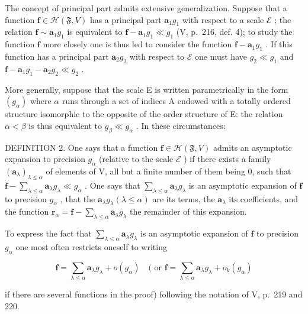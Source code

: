 The concept of principal part admits extensive generalization. Suppose that a function \(\mathbf{f} \in \mathcal{H}(\mathfrak{F}, V)\) has a principal part \(\mathbf{a}_1g_1\) with respect to a scale \(\mathcal{E}\) ; the relation \(\mathbf{f} \sim \mathbf{a}_1g_1\) is equivalent to \(\mathbf{f} - \mathbf{a}_1g_1 \ll g_1\) (V, p.~216, def. 4); to study the function \(\mathbf{f}\) more closely one is thus led to consider the function \(\mathbf{f} - \mathbf{a}_1g_1\) . If this function has a principal part \(\mathbf{a}_2g_2\) with respect to \(\mathcal{E}\) one must have \(g_2 \ll g_1\) and \(\mathbf{f} - \mathbf{a}_1g_1 - \mathbf{a}_2g_2 \ll g_2\) .

More generally, suppose that the scale E is written parametrically in the form \((g_{\alpha})\) where \(\alpha\) runs through a set of indices A endowed with a totally ordered structure isomorphic to the opposite of the order structure of E: the relation \(\alpha < \beta\) is thus equivalent to \(g_{\beta} \ll g_{\alpha}\) . In these circumstances:

DEFINITION 2. One says that a function \(\mathbf{f} \in \mathcal{H}(\mathfrak{F}, V)\) admits an asymptotic expansion to precision \(g_{\alpha}\) (relative to the scale \(\mathcal{E}\) ) if there exists a family \((\mathbf{a}_{\lambda})_{\lambda \leqslant \alpha}\) of elements of V, all but a finite number of them being 0, such that \(\mathbf{f} - \sum_{\lambda \leqslant \alpha} \mathbf{a}_{\lambda} g_{\lambda} \ll g_{\alpha}\) . One says that \(\sum_{\lambda \leqslant \alpha} \mathbf{a}_{\lambda} g_{\lambda}\) is an asymptotic expansion of \(\mathbf{f}\) to precision \(g_{\alpha}\) , that the \(\mathbf{a}_{\lambda} g_{\lambda} (\lambda \leqslant \alpha)\) are its terms, the \(\mathbf{a}_{\lambda}\) its coefficients, and the function \(\mathbf{r}_{\alpha} = \mathbf{f} - \sum_{\lambda \leqslant \alpha} \mathbf{a}_{\lambda} g_{\lambda}\) the remainder of this expansion.

To express the fact that \(\sum_{\lambda \leqslant \alpha} \mathbf{a}_{\lambda} g_{\lambda}\) is an asymptotic expansion of \(\mathbf{f}\) to precision \(g_{\alpha}\) one most often restricts oneself to writing

\[
\mathbf {f} = \sum_ {\lambda \leqslant \alpha} \mathbf {a} _ {\lambda} g _ {\lambda} + o (g _ {\alpha}) \quad (\text { or } \mathbf {f} = \sum_ {\lambda \leqslant \alpha} \mathbf {a} _ {\lambda} g _ {\lambda} + o _ {k} (g _ {\alpha})
\]

if there are several functions in the proof) following the notation of V, p.~219 and 220.

